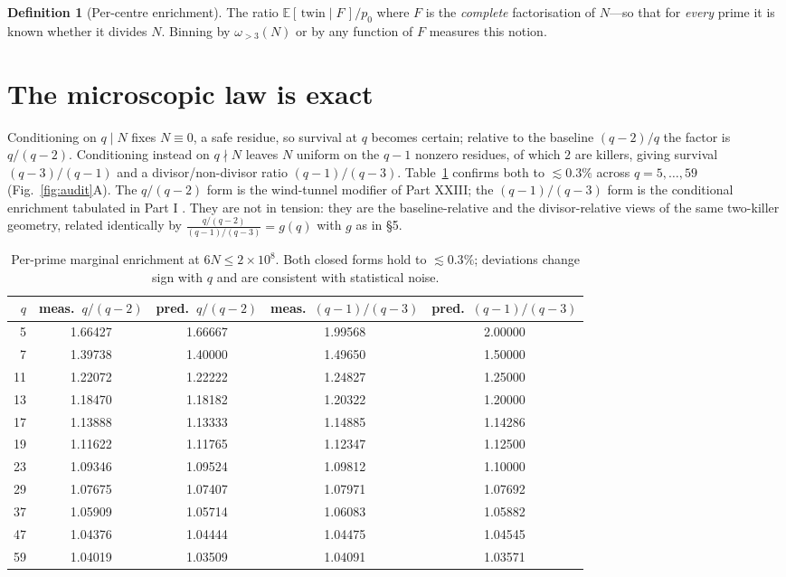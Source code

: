 \documentclass[11pt]{article}
\theoremstyle{definition}
\newtheorem{definition}{Definition}
\begin{document}
\begin{definition}[Per-centre enrichment]
The ratio $\mathbb{E}[\,\text{twin}\mid F\,]/p_0$ where $F$ is the \emph{complete} factorisation of $N$---so
that for \emph{every} prime it is known whether it divides $N$. Binning by $\omega_{>3}(N)$ or by any
function of $F$ measures this notion.
\end{definition}

\section{The microscopic law is exact}
Conditioning on $q\mid N$ fixes $N\equiv0$, a safe residue, so survival at $q$ becomes certain; relative
to the baseline $(q-2)/q$ the factor is $q/(q-2)$. Conditioning instead on $q\nmid N$ leaves $N$ uniform on
the $q-1$ nonzero residues, of which $2$ are killers, giving survival $(q-3)/(q-1)$ and a divisor/non-divisor
ratio $(q-1)/(q-3)$. Table~\ref{tab:perprime} confirms both to $\lesssim0.3\%$ across $q=5,\dots,59$
(Fig.~\ref{fig:audit}A). The $q/(q-2)$ form is the wind-tunnel modifier of Part XXIII; the $(q-1)/(q-3)$ form
is the conditional enrichment tabulated in Part I \cite{PI,PXXIII}. They are not in tension: they are the
baseline-relative and the divisor-relative views of the same two-killer geometry, related identically by
$\frac{q/(q-2)}{(q-1)/(q-3)}=g(q)$ with $g$ as in \S5.

\begin{table}[t]
\centering
\small
\begin{tabular}{rcccc}
\toprule
$q$ & meas.\ $q/(q-2)$ & pred.\ $q/(q-2)$ & meas.\ $(q-1)/(q-3)$ & pred.\ $(q-1)/(q-3)$\\
\midrule
5 & 1.66427 & 1.66667 & 1.99568 & 2.00000 \\
7 & 1.39738 & 1.40000 & 1.49650 & 1.50000 \\
11 & 1.22072 & 1.22222 & 1.24827 & 1.25000 \\
13 & 1.18470 & 1.18182 & 1.20322 & 1.20000 \\
17 & 1.13888 & 1.13333 & 1.14885 & 1.14286 \\
19 & 1.11622 & 1.11765 & 1.12347 & 1.12500 \\
23 & 1.09346 & 1.09524 & 1.09812 & 1.10000 \\
29 & 1.07675 & 1.07407 & 1.07971 & 1.07692 \\
37 & 1.05909 & 1.05714 & 1.06083 & 1.05882 \\
47 & 1.04376 & 1.04444 & 1.04475 & 1.04545 \\
59 & 1.04019 & 1.03509 & 1.04091 & 1.03571 \\
\bottomrule
\end{tabular}
\caption{Per-prime marginal enrichment at $6N\le2\times10^{8}$. Both closed forms hold to $\lesssim0.3\%$;
deviations change sign with $q$ and are consistent with statistical noise.}
\label{tab:perprime}
\end{table}
\end{document}
